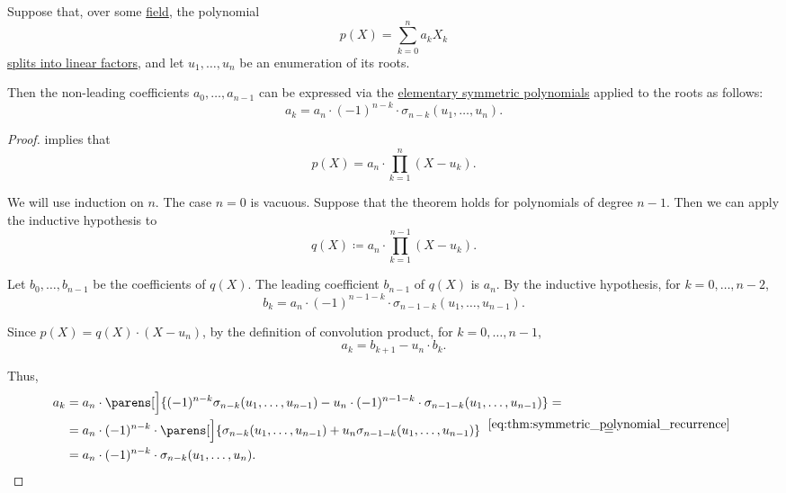 \begin{theorem}\label{thm:vietas_formulas}
  Suppose that, over some \hyperref[def:field]{field}, the polynomial
  \begin{equation*}
    p(X) = \sum_{k=0}^n a_k X_k
  \end{equation*}
  \hyperref[def:polynomial_splits_into_linear_factors]{splits into linear factors}, and let \( u_1, \ldots, u_n \) be an enumeration of its roots.

  Then the non-leading coefficients \( a_0, \ldots, a_{n-1} \) can be expressed via the \hyperref[def:elementary_symmetric_polynomial]{elementary symmetric polynomials} applied to the roots as follows:
  \begin{equation}\label{eq:thm:vietas_formulas}
    a_k = a_n \cdot (-1)^{n-k} \cdot \sigma_{n-k}(u_1, \ldots, u_n).
  \end{equation}
\end{theorem}
\begin{proof}
   implies that
  \begin{equation*}
    p(X) = a_n \cdot \prod_{k=1}^n (X - u_k).
  \end{equation*}

  We will use induction on \( n \). The case \( n = 0 \) is vacuous. Suppose that the theorem holds for polynomials of degree \( n - 1 \). Then we can apply the inductive hypothesis to
  \begin{equation*}
    q(X) \coloneqq a_n \cdot \prod_{k=1}^{n-1} (X - u_k).
  \end{equation*}

  Let \( b_0, \ldots, b_{n-1} \) be the coefficients of \( q(X) \). The leading coefficient \( b_{n-1} \) of \( q(X) \) is \( a_n \). By the inductive hypothesis, for \( k = 0, \ldots, n - 2 \),
  \begin{equation*}
    b_k = a_n \cdot (-1)^{n-1-k} \cdot \sigma_{n-1-k}(u_1, \ldots, u_{n-1}).
  \end{equation*}

  Since \( p(X) = q(X) \cdot (X - u_n) \), by the definition of convolution product, for \( k = 0, \ldots, n - 1 \),
  \begin{equation*}
    a_k = b_{k+1} - u_n \cdot b_k.
  \end{equation*}

  Thus,
  \begin{align*}
    a_k
    &=
    a_n \cdot \parens[\Big]{ (-1)^{n-k} \sigma_{n-k}(u_1, \ldots, u_{n-1}) - u_n \cdot (-1)^{n-1-k} \cdot \sigma_{n-1-k}(u_1, \ldots, u_{n-1}) }
    = \\ &=
    a_n \cdot (-1)^{n-k} \cdot \parens[\Big]{ \sigma_{n-k}(u_1, \ldots, u_{n-1}) + u_n \sigma_{n-1-k}(u_1, \ldots, u_{n-1}) }
    \reloset {\eqref{eq:thm:symmetric_polynomial_recurrence}} = \\ &=
    a_n \cdot (-1)^{n-k} \cdot \sigma_{n-k}(u_1, \ldots, u_n).
  \end{align*}
\end{proof}

